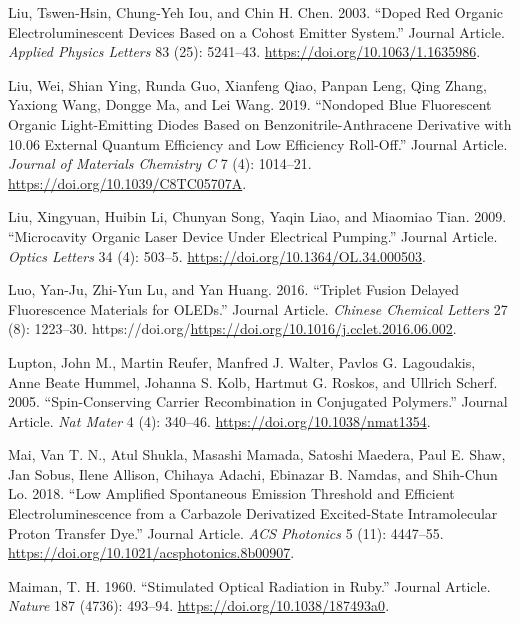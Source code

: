 \documentclass[
  letterpaper,
  DIV=11,
  numbers=noendperiod,
  oneside]{scrreprt}
\newlength{\cslhangindent}
\newlength{\cslentryspacingunit} %
\newenvironment{CSLReferences}[2] %
 {%
  \setlength{\parindent}{0pt}
  \ifodd #1
  \let\oldpar\par
  \def\par{\hangindent=\cslhangindent\oldpar}
  \fi
  \setlength{\parskip}{#2\cslentryspacingunit}
 }%
 {}
\begin{document}
\begin{CSLReferences}{1}{0}
\leavevmode{}%
Liu, Tswen-Hsin, Chung-Yeh Iou, and Chin H. Chen. 2003. {``Doped Red
Organic Electroluminescent Devices Based on a Cohost Emitter System.''}
Journal Article. \emph{Applied Physics Letters} 83 (25): 5241--43.
\url{https://doi.org/10.1063/1.1635986}.

\leavevmode{}%
Liu, Wei, Shian Ying, Runda Guo, Xianfeng Qiao, Panpan Leng, Qing Zhang,
Yaxiong Wang, Dongge Ma, and Lei Wang. 2019. {``Nondoped Blue
Fluorescent Organic Light-Emitting Diodes Based on
Benzonitrile-Anthracene Derivative with 10.06 External Quantum
Efficiency and Low Efficiency Roll-Off.''} Journal Article.
\emph{Journal of Materials Chemistry C} 7 (4): 1014--21.
\url{https://doi.org/10.1039/C8TC05707A}.

\leavevmode{}%
Liu, Xingyuan, Huibin Li, Chunyan Song, Yaqin Liao, and Miaomiao Tian.
2009. {``Microcavity Organic Laser Device Under Electrical Pumping.''}
Journal Article. \emph{Optics Letters} 34 (4): 503--5.
\url{https://doi.org/10.1364/OL.34.000503}.

\leavevmode{}%
Luo, Yan-Ju, Zhi-Yun Lu, and Yan Huang. 2016. {``Triplet Fusion Delayed
Fluorescence Materials for OLEDs.''} Journal Article. \emph{Chinese
Chemical Letters} 27 (8): 1223--30.
https://doi.org/\url{https://doi.org/10.1016/j.cclet.2016.06.002}.

\leavevmode{}%
Lupton, John M., Martin Reufer, Manfred J. Walter, Pavlos G. Lagoudakis,
Anne Beate Hummel, Johanna S. Kolb, Hartmut G. Roskos, and Ullrich
Scherf. 2005. {``Spin-Conserving Carrier Recombination in Conjugated
Polymers.''} Journal Article. \emph{Nat Mater} 4 (4): 340--46.
\url{https://doi.org/10.1038/nmat1354}.

\leavevmode{}%
Mai, Van T. N., Atul Shukla, Masashi Mamada, Satoshi Maedera, Paul E.
Shaw, Jan Sobus, Ilene Allison, Chihaya Adachi, Ebinazar B. Namdas, and
Shih-Chun Lo. 2018. {``Low Amplified Spontaneous Emission Threshold and
Efficient Electroluminescence from a Carbazole Derivatized Excited-State
Intramolecular Proton Transfer Dye.''} Journal Article. \emph{ACS
Photonics} 5 (11): 4447--55.
\url{https://doi.org/10.1021/acsphotonics.8b00907}.

\leavevmode{}%
Maiman, T. H. 1960. {``Stimulated Optical Radiation in Ruby.''} Journal
Article. \emph{Nature} 187 (4736): 493--94.
\url{https://doi.org/10.1038/187493a0}.


\end{CSLReferences}
\end{document}
